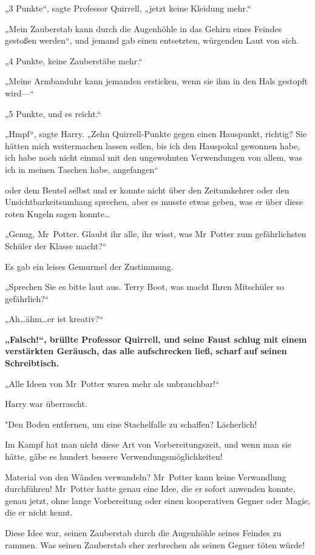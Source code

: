 {„3 Punkte“, sagte Professor Quirrell, „jetzt keine Kleidung mehr.“

„Mein Zauberstab kann durch die Augenhöhle in das Gehirn eines Feindes gestoßen werden“, und jemand gab einen entsetzten, würgenden Laut von sich.

„4 Punkte, keine Zauberstäbe mehr.“

„Meine Armbanduhr kann jemanden ersticken, wenn sie ihm in den Hals gestopft wird—“

„5 Punkte, und es reicht.“

„Hmpf“, sagte Harry. „Zehn Quirrell-Punkte gegen einen Hauspunkt, richtig? Sie hätten mich weitermachen lassen sollen, bis ich den Hauspokal gewonnen habe, ich habe noch nicht einmal mit den ungewohnten Verwendungen von allem, was ich in meinen Taschen habe, angefangen“

oder dem Beutel selbst und er konnte nicht über den Zeitumkehrer oder den Unsichtbarkeitsumhang sprechen, aber es musste etwas geben, was er über diese roten Kugeln sagen konnte…

„Genug, Mr~Potter. Glaubt ihr alle, ihr wisst, was Mr~Potter zum gefährlichsten Schüler der Klasse macht?“

Es gab ein leises Gemurmel der Zustimmung.

„Sprechen Sie es bitte laut aus. Terry Boot, was macht Ihren Mitschüler so gefährlich?“

„Ah…ähm…er ist kreativ?“

\textbf{„Falsch!“, brüllte Professor Quirrell, und seine Faust schlug mit einem verstärkten Geräusch, das alle aufschrecken ließ, scharf auf seinen Schreibtisch.}

„Alle Ideen von Mr~Potter waren mehr als unbrauchbar!“

Harry war überrascht.

"Den Boden entfernen, um eine Stachelfalle zu schaffen? Lächerlich!

Im Kampf hat man nicht diese Art von Vorbereitungszeit, und wenn man sie hätte, gäbe es hundert bessere Verwendungsmöglichkeiten!

Material von den Wänden verwandeln? Mr~Potter kann keine Verwandlung durchführen! Mr~Potter hatte genau eine Idee, die er sofort anwenden konnte, genau jetzt, ohne lange Vorbereitung oder einen kooperativen Gegner oder Magie, die er nicht kennt.

Diese Idee war, seinen Zauberstab durch die Augenhöhle seines Feindes zu rammen. Was seinen Zauberstab eher zerbrechen als seinen Gegner töten würde!

}
